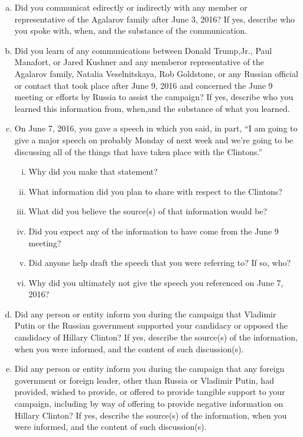 \begin{enumerate}[a.]
\item Did you communicat edirectly or indirectly with any member or representative of the Agalarov family after June 3, 2016?
If yes, describe who you spoke with, when, and the substance of the communication.

\item Did you learn of any communications between Donald Trump,Jr., Paul Manafort, or Jared Kushner and any memberor representative of the Agalarov family, Natalia Veselnitskaya, Rob Goldstone, or any Russian official or contact that took place after June 9, 2016 and concerned the June 9 meeting or efforts by Russia to assist the campaign?
If yes, describe who you learned this information from, when,and the substance of what you learned.

\item On June 7, 2016, you gave a speech in which you said, in part, “I am going to give a major speech on probably Monday of next week and we’re going to be discussing all of the things that have taken place with the Clintons.”

\begin{enumerate}[i.]

\item Why did you make that statement?
\item What information did you plan to share with respect to the Clintons?
\item What did you believe the source(s) of that information would be?
\item Did you expect any of the information to have come from the June 9 meeting?
\item Did anyone help draft the speech that you were referring to? If so, who?
\item Why did you ultimately not give the speech you referenced on June 7, 2016?

\end{enumerate}

\item Did any person or entity inform you during the campaign that Vladimir Putin or the Russian government supported your candidacy or opposed the candidacy of Hillary Clinton?
If yes, describe the source(s) of the information, when you were informed, and the content of such discussion(s).

\item Did any person or entity inform you during the campaign that any foreign government or foreign leader, other than Russia or Vladimir Putin, had provided, wished to provide, or offered to provide tangible support to your campaign, including by way of offering to provide negative information on Hillary Clinton?
If yes, describe the source(s) of the information, when you were informed, and the content of such discussion(s).

\end{enumerate}

